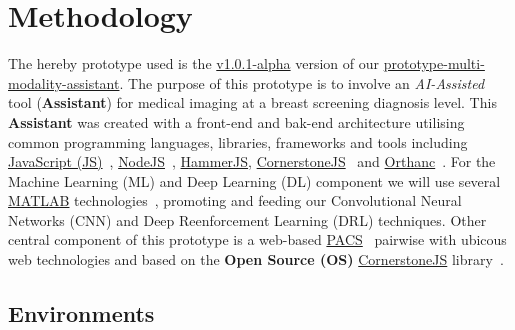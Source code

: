 
\section{Methodology}
\label{sec:sec004}

The hereby prototype used is the \hyperlink{https://github.com/mida-project/prototype-multi-modality-assistant/releases/tag/v1.0.1-alpha}{v1.0.1-alpha} version of our \hyperlink{https://github.com/mida-project/prototype-multi-modality-assistant/}{prototype-multi-modality-assistant}. The purpose of this prototype is to involve an \textit{AI-Assisted} tool (\textbf{Assistant}) for medical imaging at a breast screening diagnosis level. This \textbf{Assistant} was created with a front-end and bak-end architecture utilising common programming languages, libraries, frameworks and tools including \hyperlink{https://www.javascript.com/}{JavaScript (JS)}~\cite{flanagan2006javascript}, \hyperlink{https://nodejs.org/}{NodeJS}~\cite{wilson2018node}, \hyperlink{https://hammerjs.github.io/}{HammerJS}, \hyperlink{https://cornerstonejs.org/}{CornerstoneJS}~\cite{hostetter2018integration} and \hyperlink{https://www.orthanc-server.com/}{Orthanc}~\cite{Jodogne:ISBI2013}. For the Machine Learning (ML) and Deep Learning (DL) component we will use several \hyperlink{https://www.mathworks.com/products/matlab.html}{MATLAB} technologies~\cite{vedaldi2015matconvnet}, promoting and feeding our Convolutional Neural Networks (CNN) and Deep Reenforcement Learning (DRL) techniques. Other central component of this prototype is a web-based \hyperlink{https://www.sciencedirect.com/topics/medicine-and-dentistry/picture-archiving-and-communication-system}{PACS}~\cite{cooke2003picture} pairwise with ubicous web technologies and based on the \textbf{Open Source (OS)} \hyperlink{https://cornerstonejs.org/}{CornerstoneJS} library~\cite{feller2002understanding, hostetter2018integration}.


\subsection{Environments}

